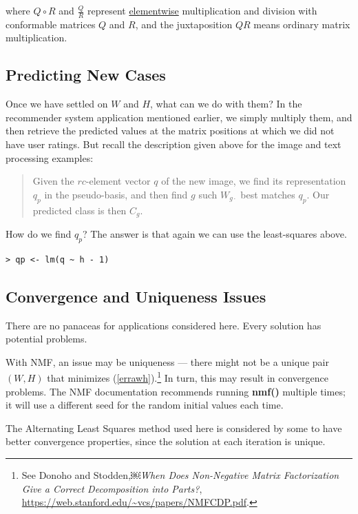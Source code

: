 where $Q \circ R$ and $\frac{Q}{R}$ represent \underline{elementwise}
multiplication and division with conformable matrices $Q$ and $R$, and
the juxtaposition $QR$ means ordinary matrix multiplication.

\subsection{Predicting New Cases}

Once we have settled on $W$ and $H$, what can we do with them?  In the
recommender system application mentioned earlier, we simply multiply
them, and then retrieve the predicted values at the matrix positions at
which we did not have user ratings.  But recall the description given
above for the image and text processing examples: 

\begin{quote}
Given the $rc$-element vector $q$ of the new image, we find
its representation $q_p$ in the pseudo-basis, and then find $g$ such
$W_{g \cdot}$ best matches $q_p$.  Our predicted class is then $C_g$.
\end{quote}

How do we find $q_p$?  The answer is that again we can use the
least-squares above.

\begin{lstlisting}
> qp <- lm(q ~ h - 1)
\end{lstlisting}

\subsection{Convergence and Uniqueness Issues}

There are no panaceas for applications considered here.  Every solution
has potential problems.

With NMF, an issue may be uniqueness --- there might not be a unique
pair $(W,H)$ that minimizes (\ref{errawh}).\footnote{See Donoho and
Stodden,￼{\it When Does Non-Negative Matrix Factorization Give a Correct
Decomposition into Parts?},
\url{https://web.stanford.edu/~vcs/papers/NMFCDP.pdf}.  } In turn, this
may result in convergence problems. The NMF documentation recommends
running {\bf nmf()} multiple times; it will use a different seed for the
random initial values each time.

The Alternating Least Squares method used here is considered by some to
have better convergence properties, since the solution at each iteration
is unique.  

